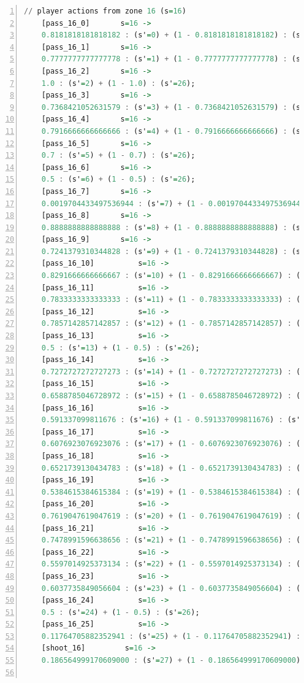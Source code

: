 \documentclass{l4proj}
\begin{document}
\begin{appendices}
\begin{lstlisting}[language=Haskell, numbers=left, caption=MDP used for strategy generation. This is the model specification as-is after the refinements at the end of chapter 3.]
	// player actions from zone 16 (s=16)
	[pass_16_0]	      s=16 ->
	0.8181818181818182 : (s'=0) + (1 - 0.8181818181818182) : (s'=26);
	[pass_16_1]	      s=16 ->
	0.7777777777777778 : (s'=1) + (1 - 0.7777777777777778) : (s'=26);
	[pass_16_2]	      s=16 ->
	1.0 : (s'=2) + (1 - 1.0) : (s'=26);
	[pass_16_3]	      s=16 ->
	0.7368421052631579 : (s'=3) + (1 - 0.7368421052631579) : (s'=26);
	[pass_16_4]	      s=16 ->
	0.7916666666666666 : (s'=4) + (1 - 0.7916666666666666) : (s'=26);
	[pass_16_5]	      s=16 ->
	0.7 : (s'=5) + (1 - 0.7) : (s'=26);
	[pass_16_6]	      s=16 ->
	0.5 : (s'=6) + (1 - 0.5) : (s'=26);
	[pass_16_7]	      s=16 ->
	0.0019704433497536944 : (s'=7) + (1 - 0.0019704433497536944) : (s'=26);
	[pass_16_8]	      s=16 ->
	0.8888888888888888 : (s'=8) + (1 - 0.8888888888888888) : (s'=26);
	[pass_16_9]	      s=16 ->
	0.7241379310344828 : (s'=9) + (1 - 0.7241379310344828) : (s'=26);
	[pass_16_10]	      s=16 ->
	0.8291666666666667 : (s'=10) + (1 - 0.8291666666666667) : (s'=26);
	[pass_16_11]	      s=16 ->
	0.7833333333333333 : (s'=11) + (1 - 0.7833333333333333) : (s'=26);
	[pass_16_12]	      s=16 ->
	0.7857142857142857 : (s'=12) + (1 - 0.7857142857142857) : (s'=26);
	[pass_16_13]	      s=16 ->
	0.5 : (s'=13) + (1 - 0.5) : (s'=26);
	[pass_16_14]	      s=16 ->
	0.7272727272727273 : (s'=14) + (1 - 0.7272727272727273) : (s'=26);
	[pass_16_15]	      s=16 ->
	0.6588785046728972 : (s'=15) + (1 - 0.6588785046728972) : (s'=26);
	[pass_16_16]	      s=16 ->
	0.591337099811676 : (s'=16) + (1 - 0.591337099811676) : (s'=26);
	[pass_16_17]	      s=16 ->
	0.6076923076923076 : (s'=17) + (1 - 0.6076923076923076) : (s'=26);
	[pass_16_18]	      s=16 ->
	0.6521739130434783 : (s'=18) + (1 - 0.6521739130434783) : (s'=26);
	[pass_16_19]	      s=16 ->
	0.5384615384615384 : (s'=19) + (1 - 0.5384615384615384) : (s'=26);
	[pass_16_20]	      s=16 ->
	0.7619047619047619 : (s'=20) + (1 - 0.7619047619047619) : (s'=26);
	[pass_16_21]	      s=16 ->
	0.7478991596638656 : (s'=21) + (1 - 0.7478991596638656) : (s'=26);
	[pass_16_22]	      s=16 ->
	0.5597014925373134 : (s'=22) + (1 - 0.5597014925373134) : (s'=26);
	[pass_16_23]	      s=16 ->
	0.6037735849056604 : (s'=23) + (1 - 0.6037735849056604) : (s'=26);
	[pass_16_24]	      s=16 ->
	0.5 : (s'=24) + (1 - 0.5) : (s'=26);
	[pass_16_25]	      s=16 ->
	0.11764705882352941 : (s'=25) + (1 - 0.11764705882352941) : (s'=26);
	[shoot_16]	       s=16 ->
	0.186564999170609000 : (s'=27) + (1 - 0.186564999170609000) : (s'=26);


\end{lstlisting}
\end{appendices}
\end{document}
